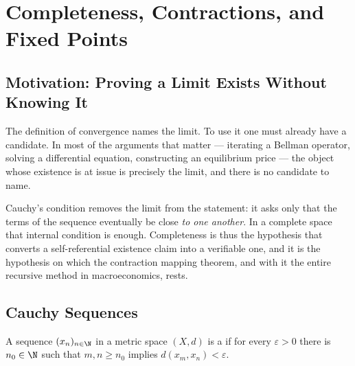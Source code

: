 
\chapter{Completeness, Contractions, and Fixed Points}
\label{ch:completeness}

\section{Motivation: Proving a Limit Exists Without Knowing It}\label{sec:comp-motivation}

The definition of convergence names the limit. To use it one must already have a
candidate. In most of the arguments that matter --- iterating a Bellman
operator, solving a differential equation, constructing an equilibrium price ---
the object whose existence is at issue is precisely the limit, and there is no
candidate to name.

Cauchy's condition removes the limit from the statement: it asks only that the
terms of the sequence eventually be close \emph{to one another}. In a complete
space that internal condition is enough. Completeness is thus the hypothesis
that converts a self-referential existence claim into a verifiable one, and it
is the hypothesis on which the contraction mapping theorem, and with it the
entire recursive method in macroeconomics, rests.

\section{Cauchy Sequences}\label{sec:comp-cauchy}

\begin{definition}\label{def:cauchy}
	A sequence $(x_n)_{n\in\N}$ in a metric space $(X,d)$ is a
	 if for every $\varepsilon>0$ there is $n_0\in\N$ such that
	$m,n\geq n_0$ implies $d(x_m,x_n)<\varepsilon$.
\end{definition}

